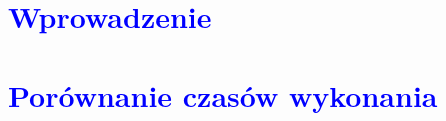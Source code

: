 \documentclass{article}
\begin{document}
	
	
	\newpage
	\titleformat{\section}{\Huge\bfseries}{\thesection}{2em}{}
	\section*{\textcolor{blue}{Wprowadzenie}}
	
	 
	
	
	\section*{\textcolor{blue}{Porównanie czasów wykonania}}
\end{document}
